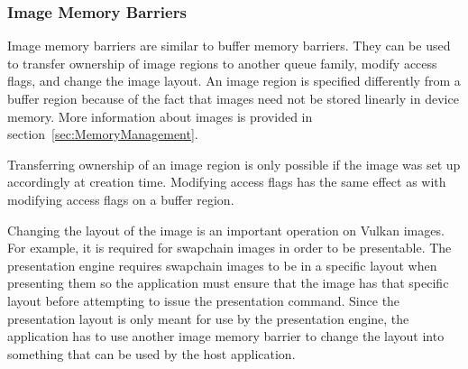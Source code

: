       \subsubsection{Image Memory Barriers}
        Image memory barriers are similar to buffer memory barriers.
        They can be used to transfer ownership of image regions to another queue family, modify access flags, and change the image layout.
        An image region is specified differently from a buffer region because of the fact that images need not be stored linearly in \gls{device} memory.
        More information about images is provided in section~\ref{sec:MemoryManagement}.

        Transferring ownership of an image region is only possible if the image was set up accordingly at creation time.
        Modifying access flags has the same effect as with modifying access flags on a buffer region.

        Changing the layout of the image is an important operation on Vulkan images.
        For example, it is required for swapchain images in order to be presentable.
        The presentation engine requires swapchain images to be in a specific layout when presenting them so the \gls{application} must ensure that the image has that specific layout before attempting to issue the presentation command.
        Since the presentation layout is only meant for use by the presentation engine, the \gls{application} has to use another image memory barrier to change the layout into something that can be used by the \gls{host} \gls{application}.
